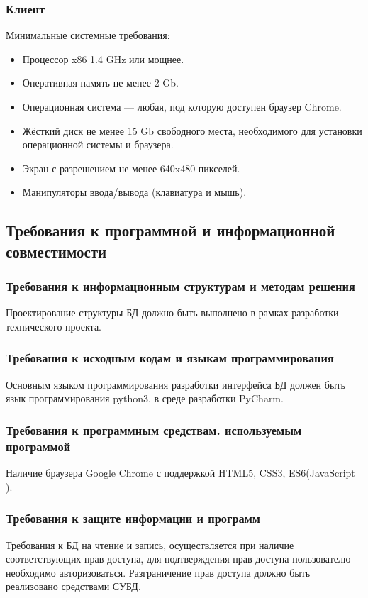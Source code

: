     \subsubsection{Клиент}
      Минимальные системные требования:
      \begin{itemize}
        \item Процессор x86 1.4 GHz или мощнее.
        \item Оперативная память не менее 2 Gb.
        \item Операционная система — любая, под которую доступен браузер Chrome.
        \item Жёсткий диск не менее 15 Gb свободного места, необходимого для установки операционной системы и браузера.
        \item Экран с разрешением не менее 640x480 пикселей.
        \item Манипуляторы ввода/вывода (клавиатура и мышь).
      \end{itemize}
  \subsection{Требования к программной и информационной совместимости}
    \subsubsection{Требования к информационным структурам и методам решения}
      Проектирование структуры БД должно быть выполнено в рамках разработки технического проекта.
    \subsubsection{Требования к исходным кодам и языкам программирования}
      Основным языком программирования разработки интерфейса БД должен быть язык программирования python3, в среде разработки PyCharm.
    \subsubsection{Требования к программным средствам. используемым программой}
      Наличие браузера Google Chrome с поддержкой HTML5, CSS3, ES6(JavaScript ).
    \subsubsection{Требования к защите информации и программ}
      Требования к БД на чтение и запись, осуществляется при наличие соответствующих прав доступа, для подтверждения прав доступа пользователю необходимо авторизоваться. Разграничение прав доступа должно быть реализовано средствами СУБД.
